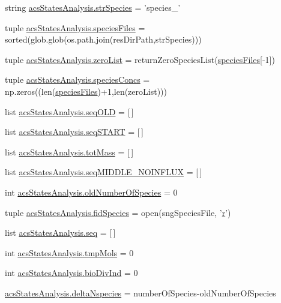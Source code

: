 \begin{DoxyCompactItemize}
string \hyperlink{a00104_ab14d209fe558e83aeede3b657a7241bb}{acs\-States\-Analysis.\-str\-Species} = 'species\-\_\-'
\item 
tuple \hyperlink{a00104_af3291bd263282353dd4a12ee38c08cae}{acs\-States\-Analysis.\-species\-Files} = sorted(glob.\-glob(os.\-path.\-join(res\-Dir\-Path,str\-Species)))
\item 
tuple \hyperlink{a00104_ac2f9e6ead14745bd749a1ab8060cd4e7}{acs\-States\-Analysis.\-zero\-List} = return\-Zero\-Species\-List(\hyperlink{a00028_af5703745c2c2a6af7f62da460994d9c2}{species\-Files}\mbox{[}-\/1\mbox{]})
\item 
tuple \hyperlink{a00104_a2377568425051a7511b51f7c50662ba1}{acs\-States\-Analysis.\-species\-Concs} = np.\-zeros((len(\hyperlink{a00028_af5703745c2c2a6af7f62da460994d9c2}{species\-Files})+1,len(zero\-List)))
\item 
list \hyperlink{a00104_a55e3b17fd716a4b1e28e7b9d93f1943c}{acs\-States\-Analysis.\-seq\-O\-L\-D} = \mbox{[}$\,$\mbox{]}
\item 
list \hyperlink{a00104_a648282264cfc8a40cf84141f9f59781f}{acs\-States\-Analysis.\-seq\-S\-T\-A\-R\-T} = \mbox{[}$\,$\mbox{]}
\item 
list \hyperlink{a00104_ac2ecae6789d89cc56b0a731065837774}{acs\-States\-Analysis.\-tot\-Mass} = \mbox{[}$\,$\mbox{]}
\item 
list \hyperlink{a00104_a8fd1a0445b2e641363a96da5a7e7159b}{acs\-States\-Analysis.\-seq\-M\-I\-D\-D\-L\-E\-\_\-\-N\-O\-I\-N\-F\-L\-U\-X} = \mbox{[}$\,$\mbox{]}
\item 
int \hyperlink{a00104_abe1ce9bb85ee916d2046efc5c3fe6b30}{acs\-States\-Analysis.\-old\-Number\-Of\-Species} = 0
\item 
tuple \hyperlink{a00104_afd34aa2ef2c410c2d71007bac0a121fd}{acs\-States\-Analysis.\-fid\-Species} = open(sng\-Species\-File, '\hyperlink{a00031_ac862e7284527eb913b1351c8bfb8e079}{r}')
\item 
list \hyperlink{a00104_a22eec19fcd0da474a136cfe97438ae3b}{acs\-States\-Analysis.\-seq} = \mbox{[}$\,$\mbox{]}
\item 
int \hyperlink{a00104_aa24f8efad70335a8460f68902001ce64}{acs\-States\-Analysis.\-tmp\-Mols} = 0
\item 
int \hyperlink{a00104_a247328d05f06695b0c2de9a001ca4548}{acs\-States\-Analysis.\-bio\-Div\-Ind} = 0
\item 
\hyperlink{a00104_a555117703c3245ec7d3d73f5d991c8c5}{acs\-States\-Analysis.\-delta\-Nspecies} = number\-Of\-Species-\/old\-Number\-Of\-Species
\item 

\end{DoxyCompactItemize}
